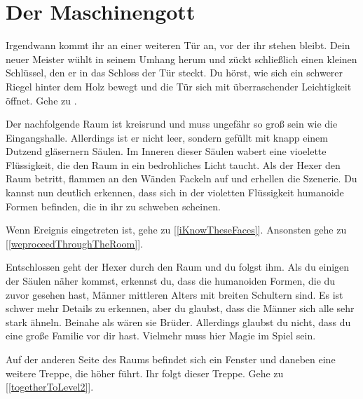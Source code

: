 \chapter*{Der Maschinengott}


Irgendwann kommt ihr an einer weiteren Tür an, vor der ihr stehen bleibt. Dein neuer Meister wühlt in seinem Umhang herum und zückt schließlich einen kleinen Schlüssel, den er in das Schloss der Tür steckt. Du hörst, wie sich ein schwerer Riegel hinter dem Holz bewegt und die Tür sich mit überraschender Leichtigkeit öffnet.
Gehe zu .


Der nachfolgende Raum ist kreisrund und muss ungefähr so groß sein wie die Eingangshalle. Allerdings ist er nicht leer, sondern gefüllt mit knapp einem Dutzend gläsernern Säulen. Im Inneren dieser Säulen wabert eine vioelette Flüssigkeit, die den Raum in ein bedrohliches Licht taucht. Als der Hexer den Raum betritt, flammen an den Wänden Fackeln auf und erhellen die Szenerie. Du kannst nun deutlich erkennen, dass sich in der violetten Flüssigkeit humanoide Formen befinden, die in ihr zu schweben scheinen.

Wenn Ereignis  eingetreten ist, gehe zu [\ref{iKnowTheseFaces}]. Ansonsten gehe zu [\ref{weproceedThroughTheRoom}].


Entschlossen geht der Hexer durch den Raum und du folgst ihm. Als du einigen der Säulen näher kommst, erkennst du, dass die humanoiden Formen, die du zuvor gesehen hast, Männer mittleren Alters mit breiten Schultern sind. Es ist schwer mehr Details zu erkennen, aber du glaubst, dass die Männer sich alle sehr stark ähneln. Beinahe als wären sie Brüder. Allerdings glaubst du nicht, dass du eine große Familie vor dir hast. Vielmehr muss hier Magie im Spiel sein.

Auf der anderen Seite des Raums befindet sich ein Fenster und daneben eine weitere Treppe, die höher führt. Ihr folgt dieser Treppe.
Gehe zu [\ref{togetherToLevel2}].


